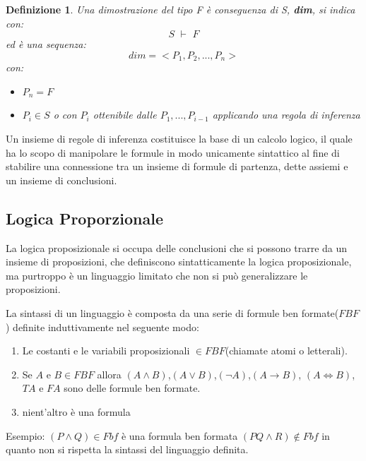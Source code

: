 \documentclass[a4paper]{report}
\newtheorem{defi}{Definizione}%
\begin{document}
\begin{defi}
Una dimostrazione del tipo \textit{F è conseguenza di S}, \textbf{dim}, si indica con:
$$S\,\,\vdash\,\, F$$
ed è una sequenza:
$$dim=<P_1,P_2,...,P_n>$$
con:
\begin{itemize}
\item $P_n=F$
\item $P_i \in S$ o con $P_i$ ottenibile dalle $P_1,...,P_{i-1}$ applicando una regola di inferenza
\end{itemize}
\end{defi}
Un insieme di regole di inferenza costituisce la base di un calcolo logico, il quale ha lo scopo di manipolare le formule in modo
unicamente sintattico al fine di stabilire una connessione tra un insieme di formule di partenza, dette assiemi e un insieme di conclusioni.

\subsection{Logica Proporzionale}
La logica proposizionale si occupa delle conclusioni che si possono trarre da un insieme di proposizioni, che definiscono sintatticamente la logica
proposizionale, ma purtroppo è un linguaggio limitato che non si può generalizzare le proposizioni.

La sintassi di un linguaggio è composta da una serie di formule ben formate($FBF$) definite induttivamente nel seguente modo:
\begin{enumerate}
  \item Le costanti e le variabili proposizionali $\in FBF$(chiamate atomi o letterali).
  \item Se $A$ e $B \in FBF$ allora $(A \land B)$,$(A \lor B)$,$(\neg A)$,$(A \rightarrow B)$,
        $(A \iff B)$,$TA$ e $FA$ sono delle formule ben formate.
  \item nient'altro è una formula
\end{enumerate}

Esempio:\newline
$(P \land Q) \in Fbf$  è una formula ben formata\newline
$(PQ \land R) \not \in Fbf$ in quanto non si rispetta la sintassi del linguaggio definita.\newline
\end{document}
